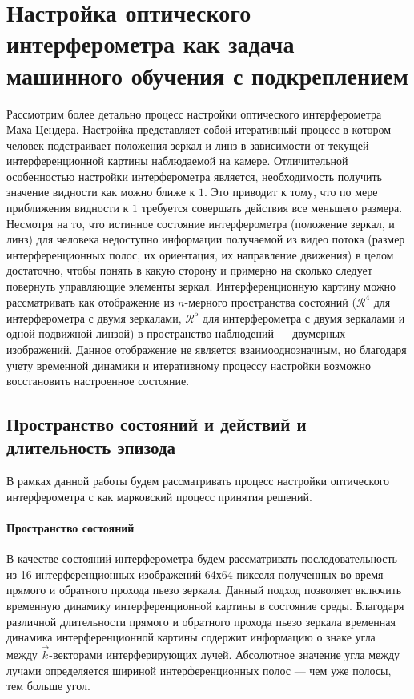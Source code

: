 \section{Настройка оптического интерферометра как задача машинного обучения с подкреплением}\label{sec:ch2/sect2}

Рассмотрим более детально процесс настройки оптического интерферометра Маха-Цендера. Настройка представляет собой итеративный процесс в котором человек подстраивает положения зеркал и линз в зависимости от текущей интерференционной картины наблюдаемой на камере. Отличительной особенностью настройки интерферометра является, необходимость получить значение видности как можно ближе к $1$. Это приводит к тому, что по мере приближения видности к $1$ требуется совершать действия все меньшего размера. Несмотря на то, что истинное состояние интерферометра (положение зеркал, и линз) для человека недоступно информации получаемой из видео потока (размер интерференционных полос, их ориентация, их направление движения) в целом достаточно, чтобы понять в какую сторону и примерно на сколько следует повернуть управляющие элементы зеркал. Интерференционную картину можно рассматривать как отображение из $n$-мерного пространства состояний ($\mathcal{R}^4$ для интерферометра с двумя зеркалами, $\mathcal{R}^5$ для интерферометра с двумя зеркалами и одной подвижной линзой) в пространство наблюдений --- двумерных изображений. Данное отображение не является взаимооднозначным, но благодаря учету временной динамики и итеративному процессу настройки возможно восстановить настроенное состояние. 


\subsection{Пространство состояний и действий и длительность эпизода}

В рамках данной работы будем рассматривать процесс настройки оптического интерферометра с как марковский процесс принятия решений. 

\paragraph{Пространство состояний}
В качестве состояний интерферометра будем рассматривать последовательность из 16 интерференционных изображений 64х64 пикселя полученных во время прямого и обратного прохода пьезо зеркала. Данный подход позволяет включить временную динамику интерференционной картины в состояние среды. Благодаря различной длительности прямого и обратного прохода пьезо зеркала временная динамика интерференционной картины содержит информацию о знаке угла между $\vec{k}$-векторами интерферирующих лучей. Абсолютное значение угла между лучами определяется шириной интерференционных полос --- чем уже полосы, тем больше угол.

